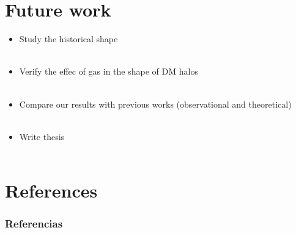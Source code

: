 \documentclass[xcolor=dvipsnames]{beamer}
\begin{document}

\section{Future work}

\begin{frame}

\begin{itemize}

\item Study the historical shape\\~\\

\item Verify the effec of gas in the shape of DM halos\\~\\

\item Compare our results with previous works (observational and theoretical)\\~\\

\item Write thesis\\~\\

\end{itemize}

\end{frame}











\section{References}
\begin{frame}[t, allowframebreaks]
\frametitle{Referencias}
\tiny


\end{frame}
\end{document}
